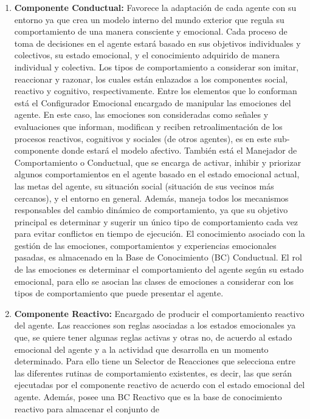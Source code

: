 \begin{enumerate}
\item \textbf{Componente Conductual:} Favorece la adaptación de cada agente con su
entorno ya que crea un modelo interno del mundo exterior que regula su
comportamiento de una manera consciente y emocional. Cada proceso de toma de
decisiones en el agente estará basado en sus objetivos individuales y
colectivos, su estado emocional, y el conocimiento adquirido de manera
individual y colectiva. Los tipos de comportamiento a considerar son imitar,
reaccionar y razonar, los cuales están enlazados a los componentes social,
reactivo y cognitivo, respectivamente. Entre los elementos que lo conforman está
el Configurador Emocional encargado de manipular las emociones del agente. En
este caso, las emociones son consideradas como señales y evaluaciones que
informan, modifican y reciben retroalimentación de los procesos reactivos,
cognitivos y sociales (de otros agentes), es en este sub-componente donde estará
el modelo afectivo. También está el Manejador de Comportamiento o Conductual,
que se encarga de activar, inhibir y priorizar algunos comportamientos en el
agente basado en el estado emocional actual, las metas del agente, su situación
social (situación de sus vecinos más cercanos), y el entorno en general. Además,
maneja todos los mecanismos responsables del cambio dinámico de comportamiento,
ya que su objetivo principal es determinar y sugerir un único tipo de
comportamiento cada vez para evitar conflictos en tiempo de ejecución. El
conocimiento asociado con la gestión de las emociones, comportamientos y
experiencias emocionales pasadas, es almacenado en la Base de Conocimiento (BC)
Conductual. El rol de las emociones es determinar el comportamiento del agente
según su estado emocional, para ello se asocian las clases de emociones a
considerar con los tipos de comportamiento que puede presentar el agente.
\item \textbf{Componente Reactivo:} Encargado de producir el comportamiento reactivo del
agente. Las reacciones son reglas asociadas a los estados emocionales ya que, se
quiere tener algunas reglas activas y otras no, de acuerdo al estado emocional
del agente y a la actividad que desarrolla en un momento determinado. Para ello
tiene un Selector de Reacciones que selecciona entre las diferentes rutinas de
comportamiento existentes, es decir, las que serán ejecutadas por el componente
reactivo de acuerdo con el estado emocional del agente. Además, posee una BC
Reactivo que es la base de conocimiento reactivo para almacenar el conjunto de

\end{enumerate}
